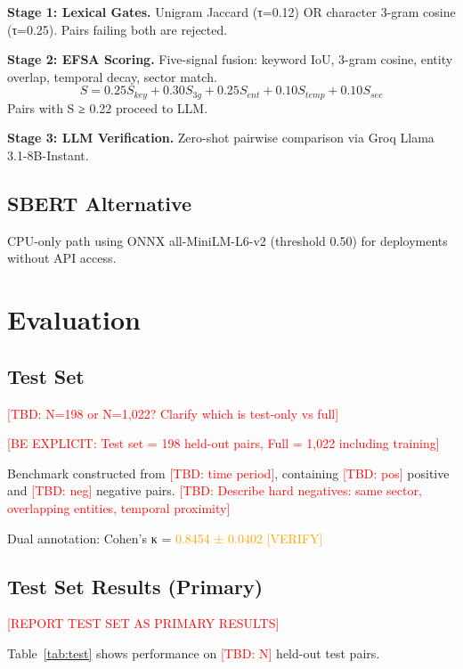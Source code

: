 \documentclass[conference]{IEEEtran}
\newcommand{\tbd}[1]{\textcolor{red}{[TBD: #1]}}
\newcommand{\verify}[1]{\textcolor{orange}{#1 [VERIFY]}}
\begin{document}
\textbf{Stage 1: Lexical Gates.}
Unigram Jaccard (τ=0.12) OR character 3-gram cosine (τ=0.25).
Pairs failing both are rejected.

\textbf{Stage 2: EFSA Scoring.}
Five-signal fusion: keyword IoU, 3-gram cosine, entity overlap, temporal decay, sector match.
\begin{equation}
S = 0.25 S_{key} + 0.30 S_{3g} + 0.25 S_{ent} + 0.10 S_{temp} + 0.10 S_{sec}
\end{equation}
Pairs with S ≥ 0.22 proceed to LLM.

\textbf{Stage 3: LLM Verification.}
Zero-shot pairwise comparison via Groq Llama 3.1-8B-Instant.

\subsection{SBERT Alternative}
CPU-only path using ONNX all-MiniLM-L6-v2 (threshold 0.50) for deployments without API access.

\section{Evaluation}

\subsection{Test Set}
\tbd{N=198 or N=1,022? Clarify which is test-only vs full}

\textcolor{red}{[BE EXPLICIT: Test set = 198 held-out pairs, Full = 1,022 including training]}

Benchmark constructed from \tbd{time period}, containing \tbd{pos} positive and \tbd{neg} negative pairs.
\tbd{Describe hard negatives: same sector, overlapping entities, temporal proximity}

Dual annotation: Cohen's κ = \verify{0.8454 ± 0.0402}

\subsection{Test Set Results (Primary)}

\textcolor{red}{[REPORT TEST SET AS PRIMARY RESULTS]}

Table~\ref{tab:test} shows performance on \tbd{N} held-out test pairs.
\end{document}

